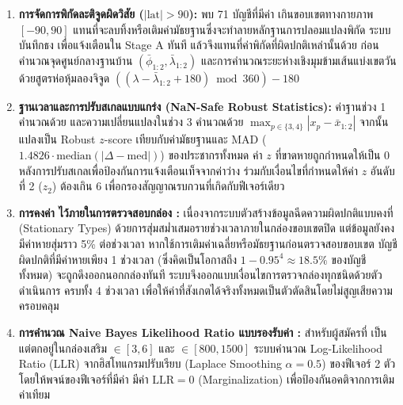 \begin{enumerate}
  \item \textbf{การจัดการพิกัดละติจูดผิดวิสัย ($|\text{lat}| > 90$):} พบ 71 บัญชีที่มีค่า  เกินขอบเขตทางกายภาพ $[-90, 90]$ แทนที่จะลบทิ้งหรือเติมค่ามัธยฐานซึ่งจะทำลายหลักฐานการปลอมแปลงพิกัด ระบบบันทึกธง  เพื่อแจ้งเตือนใน Stage A ทันที แล้วจึงแทนที่ค่าพิกัดที่ผิดปกติเหล่านั้นด้วย  ก่อนคำนวณจุดศูนย์กลางฐานบ้าน $(\bar{\phi}_{1:2}, \bar{\lambda}_{1:2})$ และการคำนวณระยะห่างเชิงมุมข้ามเส้นแบ่งเขตวันด้วยสูตรห่อหุ้มลองจิจูด $((\lambda - \bar{\lambda}_{1:2} + 180) \bmod 360) - 180$
  \item \textbf{ฐานเวลาและการปรับสเกลแบบแกร่ง (NaN-Safe Robust Statistics):} ค่าฐานช่วง 1 คำนวณด้วย  และความเปลี่ยนแปลงในช่วง 3 คำนวณด้วย $\max_{p \in \{3,4\}} |x_p - \bar{x}_{1:2}|$ จากนั้นแปลงเป็น Robust $z$-score เทียบกับค่ามัธยฐานและ $\text{MAD}$ ($1.4826 \cdot \text{median}(|\Delta - \text{med}|)$) ของประชากรทั้งหมด ค่า $z$ ที่ขาดหายถูกกำหนดให้เป็น 0 หลังการปรับสเกลเพื่อป้องกันการแจ้งเตือนเท็จจากค่าว่าง ร่วมกับเงื่อนไขที่กำหนดให้ค่า $z$ อันดับที่ 2 ($z_2$) ต้องเกิน 6 เพื่อกรองสัญญาณรบกวนที่เกิดกับฟีเจอร์เดียว
  \item \textbf{การคงค่า  ไว้ภายในการตรวจสอบกล่อง :} เนื่องจากระบบตัวสร้างข้อมูลฉีดความผิดปกติแบบคงที่ (Stationary Types) ด้วยการสุ่มสม่ำเสมอรายช่วงเวลาภายในกล่องขอบเขตปิด แต่ข้อมูลยังคงมีค่าหายสุ่มราว 5\% ต่อช่วงเวลา หากใช้การเติมค่าเฉลี่ยหรือมัธยฐานก่อนตรวจสอบขอบเขต บัญชีผิดปกติที่มีค่าหายเพียง 1 ช่วงเวลา (ซึ่งคิดเป็นโอกาสถึง $1 - 0.95^4 \approx 18.5\%$ ของบัญชีทั้งหมด) จะถูกดึงออกนอกกล่องทันที ระบบจึงออกแบบเงื่อนไขการตรวจกล่องทุกชนิดด้วยตัวดำเนินการ  ครบทั้ง 4 ช่วงเวลา เพื่อให้ค่าที่สังเกตได้จริงทั้งหมดเป็นตัวตัดสินโดยไม่สูญเสียความครอบคลุม
  \item \textbf{การคำนวณ Naive Bayes Likelihood Ratio แบบรองรับค่า :} สำหรับผู้สมัครที่  เป็น  แต่ตกอยู่ในกล่องเสริม  $\in [3, 6]$ และ  $\in [800, 1500]$ ระบบคำนวณ Log-Likelihood Ratio (LLR) จากฮิสโทแกรมปรับเรียบ (Laplace Smoothing $\alpha = 0.5$) ของฟีเจอร์ 2 ตัว โดยให้พจน์ของฟีเจอร์ที่มีค่า  มีค่า $\text{LLR} = 0$ (Marginalization) เพื่อป้องกันอคติจากการเติมค่าเทียม
\end{enumerate}

